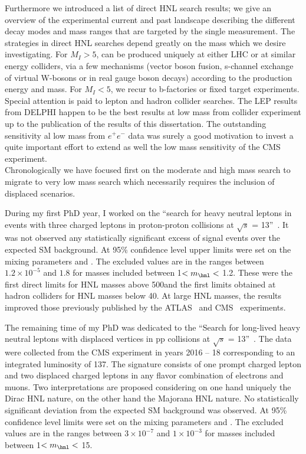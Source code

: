 Furthermore we introduced a list of direct HNL search results; we give an overview
of the experimental current and past landscape describing the different decay modes and
mass ranges that are targeted by the single measurement.
The strategies in direct HNL searches depend greatly on the mass
which we desire investigating. For $M_{I} > 5$\GeV, \hnl can be
produced uniquely at either LHC or at similar energy colliders, via a few
mechanisms (vector boson fusion, s-channel exchange of virtual
W-bosons or in real gauge boson decays) according to the production
energy and \hnl mass. For $M_{I} < 5$\GeV, we recur to b-factories
or fixed target experiments. \\
Special attention is paid to lepton and hadron collider
searches. The LEP results from DELPHI happen to be the best results at
low mass from collider experiment up to the publication of the results
of this dissertation. The outstanding sensitivity al low mass from
$e^{+}e^{-}$ data was surely a good motivation to invest a quite
important effort to extend as well the low mass sensitivity of
the CMS experiment.\\

Chronologically we have focused first on the
moderate and high mass search to migrate to very low mass search which
necessarily requires the inclusion of displaced scenarios.

During my first PhD year, I worked on the ``search for heavy neutral leptons in events with three charged
 leptons in proton-proton collisions at $\sqrt{s}$ =
 13\TeV''~\cite{Sirunyan:2018mtv}. It was not observed any
 statistically significant excess of signal events over the expected
SM background. At 95\% confidence level upper limits were set on the mixing
parameters \mixpare and \mixparm. The excluded values are in the
ranges between $1.2\times 10^{-5}$ and $1.8$ for masses included
between 1\GeV $< m_\hnl <$ 1.2\TeV. 
These were the first direct limits for HNL masses above 500\GeV and the first
limits obtained at hadron colliders for HNL masses below 40\GeV.
At large HNL masses, the results improved those previously published
by the ATLAS~\cite{Aad_2015} and CMS~\cite{Khachatryan_2015,Sirunyan:2018xiv}
experiments. 

The remaining time of my PhD was dedicated to the ``Search for long-lived heavy neutral leptons with displaced
vertices in pp collisions at $\sqrt{s}$ =
 13\TeV''~\cite{CMS-PAS-EXO-20-009}. The data were collected from the
CMS experiment in years 2016 -- 18 corresponding to an integrated
luminosity of 137\fbinv.
The signature consists of one prompt charged lepton and two displaced
charged leptons in any flavor combination of electrons
and muons. Two interpretations are proposed considering on one hand uniquely the
Dirac HNL nature, on the other hand the Majorana HNL nature. 
No statistically significant deviation from the expected
SM background was observed. At 95\% confidence level limits were set on the mixing
parameters \mixpare and \mixparm.
The excluded values are in the
ranges between $3\times 10^{-7}$ and $1\times 10^{-3}$ for masses included
between 1\GeV $< m_\hnl <$ 15\GeV. \\

